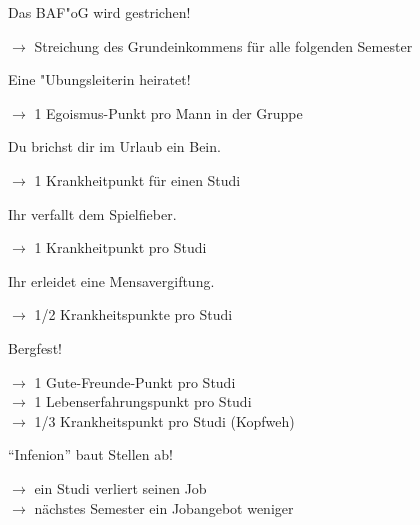 \documentclass[a4paper,12pt]{article}
\begin{document}

    Das BAF"oG wird gestrichen!

    $\rightarrow$ Streichung des Grundeinkommens f\"ur alle
    folgenden Semester
    \vspace{10mm}



    Eine "Ubungsleiterin heiratet!

    $\rightarrow$ 1 Egoismus-Punkt pro Mann in der Gruppe
    \vspace{10mm}



    Du brichst dir im Urlaub ein Bein.

    $\rightarrow$ 1 Krankheitpunkt f\"ur einen Studi
    \vspace{10mm}



    Ihr verfallt dem Spielfieber.

    $\rightarrow$ 1 Krankheitpunkt pro Studi
    \vspace{10mm}



    Ihr erleidet eine Mensavergiftung.

    $\rightarrow$ 1/2 Krankheitspunkte pro Studi
    \vspace{10mm}



    Bergfest!

    $\rightarrow$ 1 Gute-Freunde-Punkt pro Studi \\
    $\rightarrow$ 1 Lebenserfahrungspunkt pro Studi \\
    $\rightarrow$ 1/3 Krankheitspunkt pro Studi (Kopfweh)
    \vspace{10mm}



    ``Infenion'' baut Stellen ab!

    $\rightarrow$ ein Studi verliert seinen Job \\
    $\rightarrow$ n\"achstes Semester ein Jobangebot weniger
    \vspace{10mm}
\end{document}
